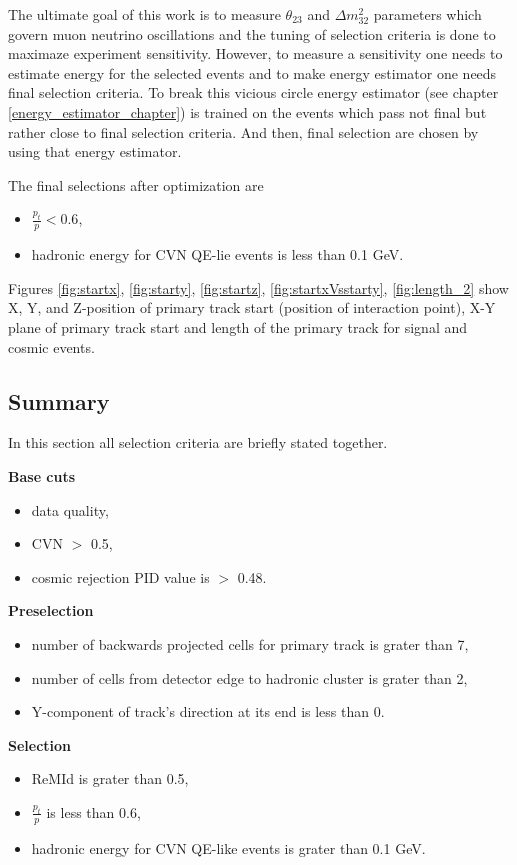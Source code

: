 The ultimate goal of this work is to measure $\theta_{23}$ and $\Delta m^2_{32}$ parameters which govern muon
neutrino oscillations and the tuning of selection criteria is done to maximaze experiment sensitivity. However,
to measure a sensitivity one needs to estimate energy for the selected events and to make energy estimator one 
needs final selection criteria. To break this vicious circle energy estimator (see chapter \ref{energy_estimator_chapter})
is trained on the events which pass not final but rather close to final selection criteria. And then, final 
selection are chosen by using that energy estimator.

The final selections after optimization are
\begin{itemize}
\item $\frac{p_t}{p} < 0.6$,
\item hadronic energy for CVN QE-lie events is less than 0.1 GeV.
\end{itemize}
Figures \ref{fig:startx}, \ref{fig:starty}, \ref{fig:startz}, \ref{fig:startxVsstarty}, \ref{fig:length_2} show
X, Y, and Z-position of primary track start (position of interaction point), X-Y plane of primary track start and
length of the primary track for signal and cosmic events. 

\subsection{Summary}
In this section all selection criteria are briefly stated together. 

\textbf{Base cuts}
\begin{itemize}
\item data quality,
\item CVN $>$ 0.5,
\item cosmic rejection PID value is $>$ 0.48.
\end{itemize}

\textbf{Preselection}
\begin{itemize}
\item number of backwards projected cells for primary track is grater than 7,
\item number of cells from detector edge to hadronic cluster is grater than 2,
\item Y-component of track's direction at its end is less than 0.
\end{itemize}

\textbf{Selection}
\begin{itemize}
\item ReMId is grater than 0.5,
\item $\frac{p_t}{p}$ is less than 0.6,
\item hadronic energy for CVN QE-like events is grater than 0.1 GeV.
\end{itemize}

